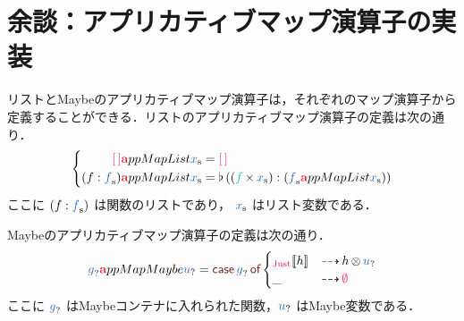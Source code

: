 \documentclass[a5paper,twoside,fleqn,draft]{jsbook}
\begin{document}
\section{余談：アプリカティブマップ演算子の実装}

リストとMaybeのアプリカティブマップ演算子は，それぞれのマップ演算子から定義することができる．リストのアプリカティブマップ演算子の定義は次の通り．
\begin{equation}
  \left\{
  \begin{aligned}
    {\hEmptyList}\hTypeName{a}ppMapList\hListVar{x}
    &={\hEmptyList}\\
    (f:\hListVar{f})\hTypeName{a}ppMapList\hListVar{x}
    &=\mJoinList{}((\hFunc{f}\hMap\hListVar{x}):(\hListVar{f}\hTypeName{a}ppMapList\hListVar{x}))
  \end{aligned}
  \right.
\end{equation}
ここに $(f:\hListVar{f})$ は関数のリストであり， $\hListVar{x}$ はリスト変数である．

Maybeのアプリカティブマップ演算子の定義は次の通り．
\begin{equation}
\label{eq:maybe-applicative-map-by-maybe-map}
\hMaybeVar{g}\hTypeName{a}ppMapMaybe\hMaybeVar{u}
=\hCaseSyntax{\hMaybeVar{g}}
\begin{cases}
\hJustWith{h}&\hIfSo h\hFunctorMap\hMaybeVar{u}\\
\_&\hIfSo\hNothing
\end{cases}
\end{equation}
ここに $\hMaybeVar{g}$ はMaybeコンテナに入れられた関数，$\hMaybeVar{u}$ はMaybe変数である．
\end{document}
